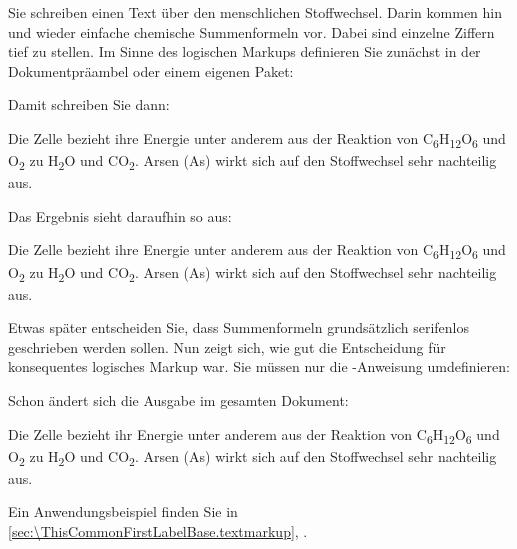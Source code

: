     \begin{Example}
      Sie schreiben einen Text über den menschlichen Stoffwechsel. Darin
      kommen hin und wieder einfache chemische Summenformeln vor. Dabei sind
      einzelne Ziffern tief zu stellen. Im Sinne des logischen Markups
      definieren Sie zunächst in der Dokumentpräambel oder einem eigenen
      Paket:
\begin{lstcode}
  \newcommand*{\Molek}[2]{#1\textsubscript{#2}}
\end{lstcode}
      \newcommand*{\Molek}[2]{#1\textsubscript{#2}}%
      Damit schreiben Sie dann:
\begin{lstcode}
  Die Zelle bezieht ihre Energie unter anderem aus
  der Reaktion von \Molek C6\Molek H{12}\Molek O6 
  und \Molek O2 zu \Molek H2\Molek O{} und 
  \Molek C{}\Molek O2. Arsen (\Molek{As}{}) wirkt
  sich auf den Stoffwechsel sehr nachteilig aus.
\end{lstcode}
      Das Ergebnis sieht daraufhin so aus:
      \begin{ShowOutput}
        Die Zelle bezieht ihre Energie unter anderem
        aus der Reaktion von 
        \Molek C6\Molek H{12}\Molek O6 und \Molek O2 zu
        \Molek H2\Molek O{} und \Molek C{}\Molek O2.  
        Arsen (\Molek{As}{}) wirkt sich auf
        den Stoffwechsel sehr nachteilig aus.
      \end{ShowOutput}

      Etwas später entscheiden Sie, dass Summenformeln grundsätzlich
      serifenlos geschrieben werden sollen. Nun zeigt sich, wie gut die
      Entscheidung für konsequentes logisches Markup war. Sie müssen nur die
      -Anweisung umdefinieren:
\begin{lstcode}
  \newcommand*{\Molek}[2]{%
    \textsf{#1\textsubscript{#2}}%
  }
\end{lstcode}
      \renewcommand*{\Molek}[2]{\textsf{#1\textsubscript{#2}}}%
      Schon ändert sich die Ausgabe im gesamten Dokument:
      \begin{ShowOutput}
        Die Zelle bezieht ihr Energie unter anderem aus der Reaktion von
        \Molek C6\Molek H{12}\Molek O6 und \Molek O2 zu \Molek H2\Molek
        O{} und \Molek C{}\Molek O2.  Arsen (\Molek{As}{}) wirkt sich
        auf den Stoffwechsel sehr nachteilig aus.
      \end{ShowOutput}
    \end{Example}
    \iffalse %
      Für Experten ist in \autoref{sec:experts.knowhow},
      \DescPageRef{experts.macroargs} dokumentiert, warum das Beispiel
      funktioniert, obwohl teilweise die Argumente von \Macro{Molek} nicht in
      geschweifte Klammern gesetzt wurden.%
    \fi%
  \else%
    Ein Anwendungsbeispiel finden Sie in
    \autoref{sec:\ThisCommonFirstLabelBase.textmarkup},
    .%
  \fi%
  \EndIndexGroup%
\fi


